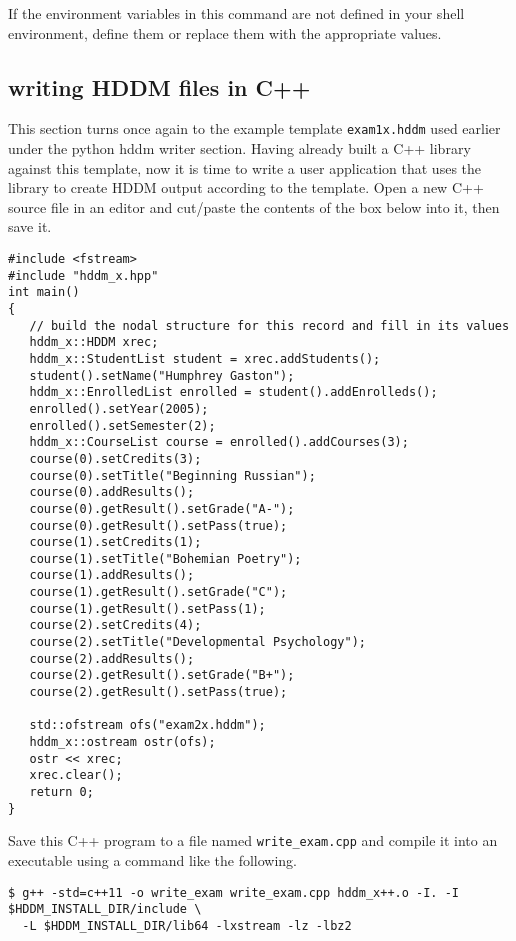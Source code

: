 \documentclass{revtex4}
\begin{document}
If the environment variables in this command are not defined in your shell
environment, define them or replace them with the appropriate values.

\subsection{writing HDDM files in C++}

This section turns once again to the example template \texttt{exam1x.hddm} used
earlier under the python hddm writer section. Having already built a C++ library
against this template, now it is time to write a user application that uses the
library to create HDDM output according to the template. Open a new C++ source
file in an editor and cut/paste the contents of the box below into it, then save it.

\vspace{0.5cm}
\begin{minipage}{12cm}
\begin{verbatim}
#include <fstream>
#include "hddm_x.hpp"
int main()
{
   // build the nodal structure for this record and fill in its values
   hddm_x::HDDM xrec;
   hddm_x::StudentList student = xrec.addStudents();
   student().setName("Humphrey Gaston");
   hddm_x::EnrolledList enrolled = student().addEnrolleds();
   enrolled().setYear(2005);
   enrolled().setSemester(2);
   hddm_x::CourseList course = enrolled().addCourses(3);
   course(0).setCredits(3);
   course(0).setTitle("Beginning Russian");
   course(0).addResults();
   course(0).getResult().setGrade("A-");
   course(0).getResult().setPass(true);
   course(1).setCredits(1);
   course(1).setTitle("Bohemian Poetry");
   course(1).addResults();
   course(1).getResult().setGrade("C");
   course(1).getResult().setPass(1);
   course(2).setCredits(4);
   course(2).setTitle("Developmental Psychology");
   course(2).addResults();
   course(2).getResult().setGrade("B+");
   course(2).getResult().setPass(true);

   std::ofstream ofs("exam2x.hddm");
   hddm_x::ostream ostr(ofs);
   ostr << xrec;
   xrec.clear();
   return 0;
}
\end{verbatim}
\end{minipage}
\vspace{0.5cm}

Save this C++ program to a file named \texttt{write\_exam.cpp} and compile it 
into an executable using a command like the following.

\vspace{0.5cm}
\begin{minipage}{12cm}
\begin{verbatim}
$ g++ -std=c++11 -o write_exam write_exam.cpp hddm_x++.o -I. -I $HDDM_INSTALL_DIR/include \
  -L $HDDM_INSTALL_DIR/lib64 -lxstream -lz -lbz2
\end{verbatim}
\end{minipage}
\vspace{0.5cm}
\end{document}
